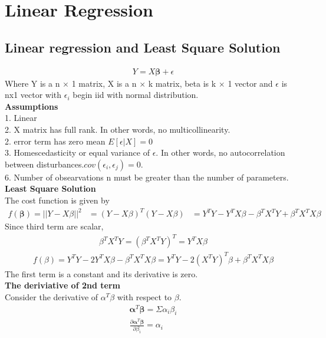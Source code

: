 \documentclass[a4paper]{article}
\begin{document}
\section{Linear Regression}
\subsection{Linear regression and Least Square Solution}
\begin{align*}
Y = X{\boldsymbol \beta} + \epsilon
\end{align*}
Where Y is a n $\times$ 1 matrix, X is a n $\times$ k matrix, beta is k $\times$ 1 vector and $\epsilon$ is nx1 vector with $\epsilon_i$ begin iid with normal distribution.\\
{\bf Assumptions}\\
1. Linear \\
2. X matrix has full rank. In other words, no multicollinearity. \\
2. error term has zero mean $E[\epsilon|X] = 0$\\
3. Homescedasticity or equal variance of $\epsilon$. In other words, no autocorrelation between disturbances.$cov(\epsilon_i, \epsilon_j)=0$.\\
6. Number of obsearvations n must be greater than the number of parameters.\\
{\bf Least Square Solution}\\
The cost function is given by
\begin{align*}
f(\boldsymbol \beta) = ||Y-X\beta||^2 & = (Y-X\beta)^T(Y-X\beta)
                      & = Y^T Y - Y^TX\beta - \beta^TX^TY +\beta^TX^T X \beta
\end{align*}
Since third term are scalar, 
\begin{align*}
 \beta^TX^TY = (\beta^TX^TY)^T = Y^TX\beta 
\end{align*}
\begin{align*}
f(\beta) = Y^T Y - 2Y^TX\beta - \beta^TX^T X \beta
            = Y^T Y - 2(X^TY)^T\beta + \beta^TX^T X \beta
\end{align*}
The first term is a constant and its derivative is zero. \\
{\bf The deriviative of 2nd term}\\
Consider the derivative of $\alpha^T \beta$ with respect to $\beta$.
\begin{align*}
\boldsymbol{\alpha}^T \boldsymbol{\beta} = \Sigma \alpha_i \beta_i \\
\frac{\partial{\boldsymbol{\alpha}^T\boldsymbol{\beta}}}{\partial \beta_i} = \alpha_i\\
\end{align*}
\end{document}
